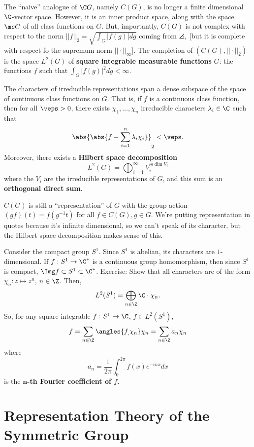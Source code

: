 The ``naive'' analogue of $\C G$, namely $C(G)$, is no longer a finite dimensional $\C$-vector space. However, it is an inner product space, along with the space $\mc C$ of all class functions on $G$. But, importantly, $C(G)$ is not complex with respect to the norm $|| f ||_2=\sqrt{\int_G |f(g)|dg}$ coming from $\angles ,$ [but it is complete with respect fo the supremum norm $||\cdot ||_\infty$]. The completion of $(C(G),||\cdot ||_2)$ is the space $L^2(G)$ of \textbf{square integrable measurable functions} $G$: the functions $f$ such that $\int _G |f(g)|^2dg < \infty$.

\begin{thm}
    The characters of irreducible representations span a dense subspace of the space of continuous class functions on $G$. That is, if $f$ is a continuous class function, then for all $\veps>0$, there exists $\chi_1,\dots,\chi_n$ irreducible characters $\lambda_i \in \C$ such that
    $$\abs{\abs{ f-\sum_{i=1}^n\lambda _i\chi _i }}_2<\veps.$$
    Moreover, there exists a \textbf{Hilbert space decomposition}
    $$L^2(G) = \bigoplus_{i=1}^\infty V_i^{\oplus \dim V_i}$$
    where the $V_i$ are the irreducible representations of $G$, and this sum is an \textbf{orthogonal direct sum}.
\end{thm}

$C(G)$ is still a ``representation'' of $G$ with the group action $(gf)(t)=f(g^{-1}t)$ for all $f \in C(G),g \in G$. We're putting representation in quotes because it's infinite dimensional, so we can't speak of its character, but the Hilbert space decomposition makes sense of this.

\begin{ex}
    Consider the compact group $S^1$. Since $S^1$ is abelian, its characters are $1$-dimensional. If $f:S^1 \to \C^*$ is a continuous group homomorphism, then since $S^1$ is compact, $\Img f\subset S^1 \subset \C^*$. Exercise: Show that all characters are of the form $\chi_n:z \mapsto z^n$, $n \in \Z$. Then,
    $$L^2(S^1)=\bigoplus_{n\in\Z}\C\cdot \chi_n.$$
    So, for any square integrable $f:S ^1 \to \C$, $f \in L^2(S^1)$,
    $$f = \sum_{n \in \Z}\angles {f_,\chi_n}\chi_n=\sum_{n \in \Z}a_n\chi _n $$
    where
    $$a_n=\frac{1}{2\pi} \int_0^{2\pi} f(x)e^{-inx}dx$$
    is the \textbf{$\bm n$-th Fourier coefficient of $f$.}
\end{ex}

\section{Representation Theory of the Symmetric Group}

